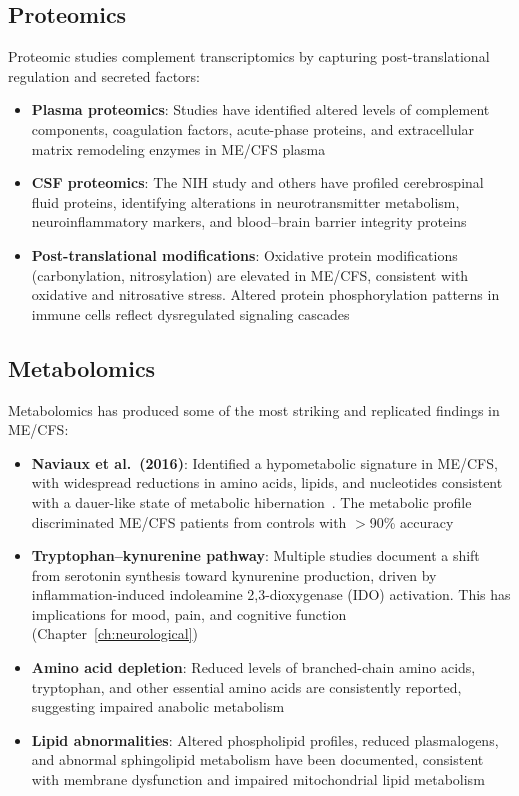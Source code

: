 \subsection{Proteomics}

Proteomic studies complement transcriptomics by capturing post-translational regulation and secreted factors:

\begin{itemize}
    \item \textbf{Plasma proteomics}: Studies have identified altered levels of complement components, coagulation factors, acute-phase proteins, and extracellular matrix remodeling enzymes in ME/CFS plasma
    \item \textbf{CSF proteomics}: The NIH study and others have profiled cerebrospinal fluid proteins, identifying alterations in neurotransmitter metabolism, neuroinflammatory markers, and blood--brain barrier integrity proteins
    \item \textbf{Post-translational modifications}: Oxidative protein modifications (carbonylation, nitrosylation) are elevated in ME/CFS, consistent with oxidative and nitrosative stress. Altered protein phosphorylation patterns in immune cells reflect dysregulated signaling cascades
\end{itemize}

\subsection{Metabolomics}

Metabolomics has produced some of the most striking and replicated findings in ME/CFS:

\begin{itemize}
    \item \textbf{Naviaux et al.\ (2016)}: Identified a hypometabolic signature in ME/CFS, with widespread reductions in amino acids, lipids, and nucleotides consistent with a dauer-like state of metabolic hibernation~\cite{Naviaux2016metabolomics}. The metabolic profile discriminated ME/CFS patients from controls with $>$90\% accuracy
    \item \textbf{Tryptophan--kynurenine pathway}: Multiple studies document a shift from serotonin synthesis toward kynurenine production, driven by inflammation-induced indoleamine 2,3-dioxygenase (IDO) activation. This has implications for mood, pain, and cognitive function (Chapter~\ref{ch:neurological})
    \item \textbf{Amino acid depletion}: Reduced levels of branched-chain amino acids, tryptophan, and other essential amino acids are consistently reported, suggesting impaired anabolic metabolism
    \item \textbf{Lipid abnormalities}: Altered phospholipid profiles, reduced plasmalogens, and abnormal sphingolipid metabolism have been documented, consistent with membrane dysfunction and impaired mitochondrial lipid metabolism
\end{itemize}

